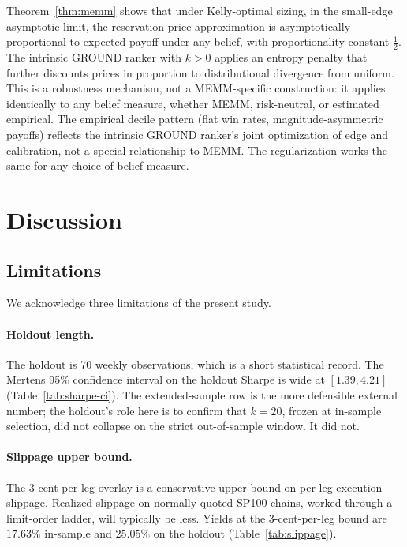 \documentclass[11pt]{article}
\theoremstyle{definition}
\theoremstyle{remark}
\begin{document}
Theorem~\ref{thm:memm} shows that under Kelly-optimal sizing, in the small-edge asymptotic limit, the
reservation-price approximation is asymptotically proportional to expected payoff under any belief, with proportionality constant $\tfrac{1}{2}$.
The intrinsic GROUND ranker with $k > 0$ applies an entropy penalty that further discounts
prices in proportion to distributional divergence from uniform. This is a
robustness mechanism, not a MEMM-specific construction: it applies identically
to any belief measure, whether MEMM, risk-neutral, or estimated empirical.
The empirical decile pattern (flat win rates, magnitude-asymmetric payoffs)
reflects the intrinsic GROUND ranker's joint optimization of edge and calibration, not a special
relationship to MEMM. The regularization works the same for any choice of belief measure.


\section{Discussion}\label{sec:discussion}

\subsection{Limitations}

We acknowledge three limitations of the present study.

\paragraph{Holdout length.}
The holdout is 70 weekly observations, which is a short
statistical record. The Mertens 95\% confidence interval on the
holdout Sharpe is wide at $[1.39, 4.21]$ (Table~\ref{tab:sharpe-ci}). The extended-sample row
is the more defensible external number; the holdout's role here is
to confirm that $k = 20$, frozen at in-sample selection, did not
collapse on the strict out-of-sample window. It did not.

\paragraph{Slippage upper bound.}
The 3-cent-per-leg overlay is a conservative upper bound on
per-leg execution slippage. Realized slippage on normally-quoted
SP100 chains, worked through a limit-order ladder, will typically
be less. Yields at the 3-cent-per-leg bound are $17.63\%$
in-sample and $25.05\%$ on the holdout
(Table~\ref{tab:slippage}).
\end{document}
